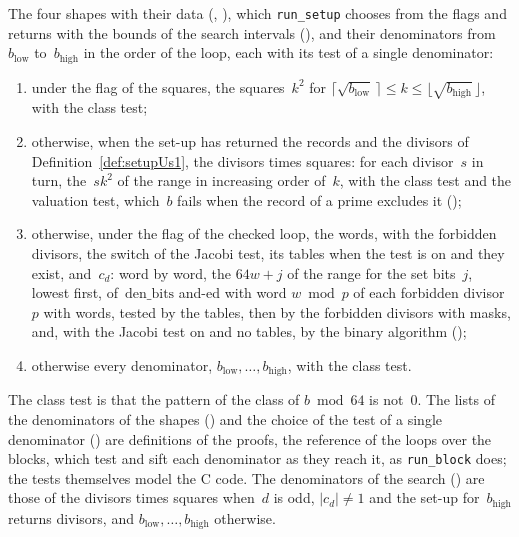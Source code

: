 \begin{definition}\label{def:Shape}
  \leanok
  The four shapes with their data (,
  ), which \verb|run_setup| chooses from the flags and returns
  with the bounds of the search intervals (), and their
  denominators from~$b_{\mathrm{low}}$ to~$b_{\mathrm{high}}$ in the order of the loop, each with
  its test of a single denominator:
  \begin{enumerate}
    \item under the flag of the squares, the squares~$k^2$ for
      $\lceil \sqrt{b_{\mathrm{low}}}\, \rceil \le k
      \le \lfloor \sqrt{b_{\mathrm{high}}}\, \rfloor$, with the class test;
    \item otherwise, when the set-up has returned the records and the divisors of
      Definition~\ref{def:setupUs1}, the divisors times squares: for each divisor~$s$ in turn,
      the~$s k^2$ of the range in increasing order of~$k$, with the class test and the valuation
      test, which~$b$ fails when the record of a prime excludes it
      ();
    \item otherwise, under the flag of the checked loop, the words, with the forbidden divisors, the
      switch of the Jacobi test, its tables when the test is on and they exist, and~$c_d$: word by
      word, the $64 w + j$ of the range for the set bits~$j$, lowest first, of~$\mathrm{den\_bits}$
      and-ed with word $w \bmod p$ of each forbidden divisor~$p$ with words, tested by the tables,
      then by the forbidden divisors with masks, and, with the Jacobi test on and no tables, by the
      binary algorithm ();
    \item otherwise every denominator, $b_{\mathrm{low}}, \dots, b_{\mathrm{high}}$, with the class
      test.
  \end{enumerate}
  The class test is that the pattern of the class of $b \bmod 64$ is not~$0$. The lists of the
  denominators of the shapes () and the choice of the test of a
  single denominator () are definitions of the proofs, the
  reference of the loops over the blocks, which test and sift each denominator as they reach it, as
  \verb|run_block| does; the tests themselves model the C code. The denominators of the search
  () are those of the divisors times squares when~$d$ is odd,
  $|c_d| \ne 1$ and the set-up for~$b_{\mathrm{high}}$ returns divisors, and
  $b_{\mathrm{low}}, \dots, b_{\mathrm{high}}$ otherwise.
\end{definition}

